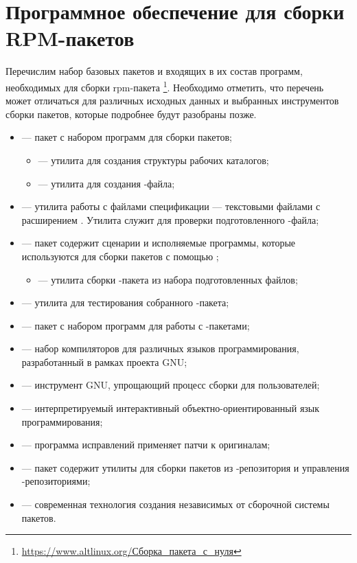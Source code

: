\section{Программное обеспечение для сборки RPM-пакетов}

Перечислим набор базовых пакетов и входящих в их состав программ, необходимых для
сборки rpm-пакета%
\footnote{\href{https://www.altlinux.org/\%D0\%A1\%D0\%B1\%D0\%BE\%D1\%80\%D0\%BA\%D0\%B0_\%D0\%BF\%D0\%B0\%D0\%BA\%D0\%B5\%D1\%82\%D0\%B0_\%D1\%81_\%D0\%BD\%D1\%83\%D0\%BB\%D1\%8F}%
{https://www.altlinux.org/Сборка\_пакета\_с\_нуля}}.
Необходимо отметить, что перечень может отличаться для различных исходных данных
и выбранных инструментов сборки пакетов, которые подробнее будут разобраны позже.

\begin{itemize}
	\item {} --- пакет с набором программ для сборки пакетов;
	\begin{itemize}
		\item {} --- утилита для создания структуры рабочих каталогов;
		\item {} --- утилита для создания -файла;
	\end{itemize}
	\item {} --- утилита работы с файлами спецификации --- текстовыми файлами с расширением
		. Утилита служит для проверки подготовленного -файла;
	\item {} --- пакет содержит сценарии и исполняемые программы, которые используются для сборки пакетов с помощью ;
	\begin{itemize}
		\item {} --- утилита сборки -пакета из набора подготовленных файлов;
	\end{itemize}
	\item {} --- утилита для тестирования собранного -пакета;
	\item {} --- пакет с набором программ для работы с -пакетами;
	\item {} --- набор компиляторов для различных языков программирования, разработанный в рамках проекта GNU;
	\item {} --- инструмент GNU, упрощающий процесс сборки для пользователей;
	\item {} --- интерпретируемый интерактивный объектно-ориентированный язык программирования;
	\item {} --- программа исправлений применяет патчи к оригиналам;
	\item {} --- пакет содержит утилиты для сборки пакетов  из -репозитория и управления -репозиториями;
	\item {} --- современная технология создания независимых от сборочной системы пакетов.
\end{itemize}


